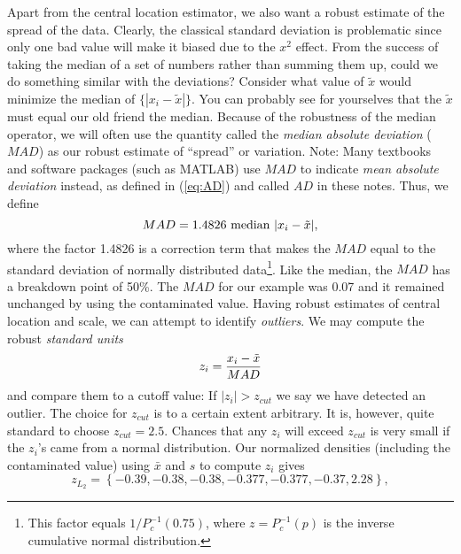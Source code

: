 	Apart from the central location estimator, we also want a robust estimate of the spread of the 
data.  Clearly, the classical standard deviation is problematic since only one bad value will make it 
biased due to the $x^2$  effect.  From the success of taking the median of a set of numbers rather 
than summing them up, could we do something similar with the deviations?  Consider what 
value of $\tilde{x}$ would minimize the median of $\{|x_i - \tilde{x}|\}$.
You can probably see for yourselves that the $\tilde{x}$ must equal 
our old friend the median.  Because of the robustness of the median operator, we will often use 
the quantity called the \emph{median absolute deviation} ($MAD$) as our robust estimate of ``spread'' or variation.
Note: Many textbooks and software packages (such as MATLAB) use $MAD$ to indicate \emph{mean absolute deviation}
instead, as defined in (\ref{eq:AD}) and called $AD$ in these notes.  Thus, we define
\begin{equation}
	\index{MAD}
	\index{Median absolute deviation}
MAD = 1.4826 \mbox{ median } |x_i - \tilde{x} |,
\end{equation}
where the factor 1.4826 is a correction term that makes the $MAD$ equal to the standard deviation 
of normally distributed data\footnote{This factor equals $1/P^{-1}_c(0.75)$, where $z = P^{-1}_c(p)$ is
the inverse cumulative normal distribution.}.  Like the median, the $MAD$ has a breakdown point of 50\%.  The $MAD$ 
for our  example was 0.07 and it remained unchanged by using the contaminated value.
	Having robust estimates of central location and scale, we can attempt to identify \emph{outliers}.  We may 
compute the robust \emph{standard units}
\begin{equation}
	\index{Normal scores!robust}
	\index{Standard scores!robust}
z_i = \frac{x_i - \tilde{x}} {MAD}
\end{equation}
and compare them to a cutoff value: If $|z_i| > z_{cut}$ we say we have detected an outlier.  The choice 
for $z_{cut}$ is to a certain extent arbitrary.  It is, however, quite standard to choose $z_{cut} = 2.5$.  Chances 
that any $z_i$ will exceed $z_{cut}$  is very small if the $z_i$'s came from a normal distribution.  Our 
normalized densities (including the contaminated value) using $\bar{x}$ and $s$ to compute $z_i$ gives 
\begin{equation}
z_{\scriptscriptstyle L_{\scriptscriptstyle 2}} = \left \{ -0.39, -0.38, -0.38, -0.377, -0.377, -0.37, 2.28\right \},
\end{equation}
